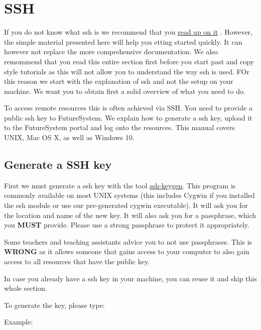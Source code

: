 \chapter{SSH}
\label{C:ssh}

If you do not know what ssh is we recommend that you
\href{http://openssh.com/manual.html}{read up on it} . However, the
simple material presented here will help you etting started quickly. It
can however not replace the more comprehensive documentation. We also
remommend that you read this entire section first before you start
past and copy style tutorials as this will not allow you to understand
the way ssh is used. FOr this reason we start with the explanation of
ssh and not the setup on your machine. We want you to obtain first a
solid overview of what you need to do.

To access remote resources this is often achieved via SSH. You need to
provide a public ssh key to FutureSystem. We explain how to generate a
ssh key, upload it to the FutureSystem portal and log onto the
resources. This manual covers UNIX, Mac OS X, as well as Windows 10.



\section{Generate a SSH key}\label{generate-a-ssh-key}

First we must generate a ssh key with the tool
\href{http://linux.die.net/man/1/ssh-keygen}{ssh-keygen}. This program
is commonly available on most UNIX systems (this includes Cygwin if
you installed the ssh module or use our pre-generated cygwin
executable). It will ask you for the location and name of the new
key. It will also ask you for a passphrase, which you \textbf{MUST}
provide. Please use a strong passphrase to protect it
appropriately.

\begin{WARNING}
  Some teachers and teaching assistants advice you to not use
  passphrases. This is \textbf{WRONG} as it allows someone that gains
  access to your computer to also gain access to all resources that
  have the public key.
\end{WARNING}

In case you already have a ssh key in your machine, you can reuse it and
skip this whole section.

To generate the key, please type:

Example:

